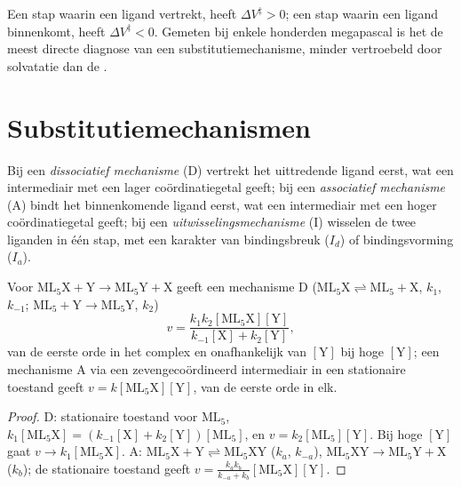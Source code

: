 Een stap waarin een ligand vertrekt, heeft $\Delta V^{\ddagger} > 0$; een stap waarin een ligand binnenkomt, heeft $\Delta V^{\ddagger}
< 0$. Gemeten bij enkele honderden megapascal is het  de
meest directe diagnose van een substitutiemechanisme, minder vertroebeld
door solvatatie dan de .

\section{Substitutiemechanismen}

\begin{definition}\label{def:b3:complex-mechanisms:mechanisms}
Bij een \emph{dissociatief mechanisme} (D)
vertrekt het uittredende ligand eerst, wat een intermediair met een
lager coördinatiegetal geeft; bij een
\emph{associatief mechanisme} (A) bindt het
binnenkomende ligand eerst, wat een intermediair met een hoger
coördinatiegetal geeft; bij een
\emph{uitwisselingsmechanisme} (I) wisselen
de twee liganden in één stap, met een karakter van bindingsbreuk ($I_d$) of bindingsvorming ($I_a$).
\end{definition}

\begin{proposition}\label{prop:b3:complex-mechanisms:d-a-laws}
Voor $\mathrm{ML_5X + Y \to ML_5Y + X}$ geeft een mechanisme D ($\mathrm{ML_5X} \rightleftharpoons \mathrm{ML_5} + \mathrm X$, $k_1$, $k_{-1}$; $\mathrm{ML_5} + \mathrm Y
\to \mathrm{ML_5Y}$, $k_2$)
\[
  v = \frac{k_1k_2[\mathrm{ML_5X}][\mathrm Y]}{k_{-1}[\mathrm X] + k_2[\mathrm Y]},
\]
van de eerste orde in het complex en onafhankelijk van $[\mathrm Y]$ bij hoge $[\mathrm Y]$; een mechanisme A
via een zevengecoördineerd intermediair in een stationaire toestand geeft $v =
k[\mathrm{ML_5X}][\mathrm Y]$, van de eerste orde in elk.
\end{proposition}

\begin{proof}
D: stationaire toestand voor $\mathrm{ML_5}$, $k_1[\mathrm{ML_5X}] = (k_{-1}[\mathrm X] + k_2[\mathrm Y])[\mathrm{ML_5}]$, en $v = k_2[\mathrm{ML_5}][\mathrm Y]$.
Bij hoge $[\mathrm Y]$ gaat $v \to k_1[\mathrm{ML_5X}]$. A: $\mathrm{ML_5X} + \mathrm Y \rightleftharpoons \mathrm{ML_5XY}$ ($k_a$, $k_{-a}$), $\mathrm{ML_5XY} \to
\mathrm{ML_5Y} + \mathrm X$ ($k_b$); de stationaire toestand geeft $v = \frac{k_ak_b}{k_{-a} + k_b}[\mathrm{ML_5X}][\mathrm Y]$.
\end{proof}

